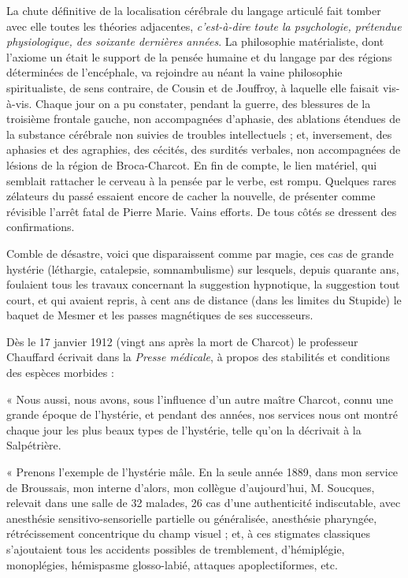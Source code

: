 \documentclass[french,twoside]{book} %
\begin{document}
La chute définitive de la localisation cérébrale du langage articulé fait tomber avec elle toutes les théories adjacentes, {\itshape c’est-à-dire toute la psychologie, prétendue physiologique, des soixante dernières années}. La philosophie matérialiste, dont l’axiome un était le support de la pensée humaine et du langage par des régions déterminées de l’encéphale, va rejoindre au néant la vaine philosophie spiritualiste, de sens contraire, de Cousin et de Jouffroy, à laquelle elle faisait vis-à-vis. Chaque jour on a pu constater, pendant la guerre, des blessures de la troisième frontale gauche, non accompagnées d’aphasie, des ablations étendues de la substance cérébrale non suivies de troubles intellectuels ; et, inversement, des aphasies et des agraphies, des cécités, des surdités verbales, non accompagnées de lésions de la région de Broca-Charcot. En fin de compte, le lien matériel, qui semblait rattacher le cerveau à la pensée par le verbe, est rompu. Quelques rares zélateurs du passé essaient encore de cacher la nouvelle, de présenter comme révisible l’arrêt fatal de Pierre Marie. Vains efforts. De tous côtés se dressent des confirmations.\par
Comble de désastre, voici que disparaissent comme par magie, ces cas de grande hystérie (léthargie, catalepsie, somnambulisme) sur lesquels, depuis quarante ans, foulaient tous les travaux concernant la suggestion hypnotique, la suggestion tout court, et qui avaient repris, à cent ans de distance (dans les limites du Stupide) le baquet de Mesmer et les passes magnétiques de ses successeurs.\par
Dès le 17 janvier 1912 (vingt ans après la mort de Charcot) le professeur Chauffard écrivait dans la {\itshape Presse médicale}, à propos des stabilités et conditions des espèces morbides :\par
« Nous aussi, nous avons, sous l’influence d’un autre maître Charcot, connu une grande époque de l’hystérie, et pendant des années, nos services nous ont montré chaque jour les plus beaux types de l’hystérie, telle qu’on la décrivait à la Salpétrière.\par
« Prenons l’exemple de l’hystérie mâle. En la seule année 1889, dans mon service de Broussais, mon interne d’alors, mon collègue d’aujourd’hui, M. Soucques, relevait dans une salle de 32 malades, 26 cas d’une authenticité indiscutable, avec anesthésie sensitivo-sensorielle partielle ou généralisée, anesthésie pharyngée, rétrécissement concentrique du champ visuel ; et, à ces stigmates classiques s’ajoutaient tous les accidents possibles de tremblement, d’hémiplégie, monoplégies, hémispasme glosso-labié, attaques apoplectiformes, etc.\par
\end{document}
